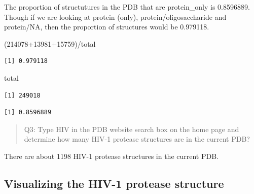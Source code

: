 \documentclass[
  letterpaper,
  DIV=11,
  numbers=noendperiod]{scrartcl}
\newenvironment{Shaded}{\begin{snugshade}}{\end{snugshade}}
\newcommand{\DecValTok}[1]{\textcolor[rgb]{0.68,0.00,0.00}{#1}}
\newcommand{\NormalTok}[1]{\textcolor[rgb]{0.00,0.23,0.31}{#1}}
\newcommand{\OtherTok}[1]{\textcolor[rgb]{0.00,0.23,0.31}{#1}}
\newcommand{\SpecialCharTok}[1]{\textcolor[rgb]{0.37,0.37,0.37}{#1}}
\begin{document}
The proportion of structutures in the PDB that are protein\_only is
0.8596889. Though if we are looking at protein (only),
protein/oligosaccharide and protein/NA, then the proportion of
structures would be 0.979118.

\begin{Shaded}
\begin{Highlighting}[]
\NormalTok{(}\DecValTok{214078}\SpecialCharTok{+}\DecValTok{13981}\SpecialCharTok{+}\DecValTok{15759}\NormalTok{)}\SpecialCharTok{/}\NormalTok{total}
\end{Highlighting}
\end{Shaded}

\begin{verbatim}
[1] 0.979118
\end{verbatim}

\begin{Shaded}
\begin{Highlighting}[]
\NormalTok{total}
\end{Highlighting}
\end{Shaded}

\begin{verbatim}
[1] 249018
\end{verbatim}

\begin{Shaded}
\end{Shaded}

\begin{verbatim}
[1] 0.8596889
\end{verbatim}

\begin{quote}
Q3: Type HIV in the PDB website search box on the home page and
determine how many HIV-1 protease structures are in the current PDB?
\end{quote}

There are about 1198 HIV-1 protease structures in the current PDB.

\subsection{Visualizing the HIV-1 protease
structure}\label{visualizing-the-hiv-1-protease-structure}
\end{document}
